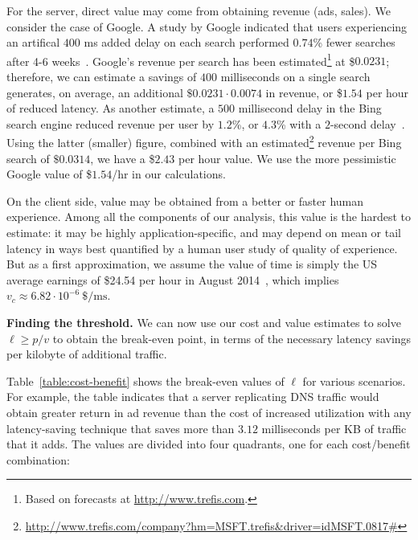 \documentclass{sigcomm-alternate}
\newcommand{\parheading}[1]{\medskip{} \noindent \textbf{#1}}
\begin{document}
For the server, direct value may come from obtaining revenue (ads, sales).  We consider the case of Google.  A study by Google indicated that users experiencing an artifical $400$ ms added delay on each search performed $0.74$\% fewer searches after 4-6 weeks~\cite{brutlag09}.  Google's revenue per search has been estimated\footnote{Based on forecasts at \url{http://www.trefis.com}.} at \$$0.0231$; therefore, we can estimate a savings of $400$ milliseconds on a single search generates, on average, an additional $\$0.0231\cdot0.0074$ in revenue, or \$$1.54$ per hour of reduced latency.  As another estimate, a $500$ millisecond delay in the Bing search engine reduced revenue per user by $1.2$\%, or $4.3$\% with a $2$-second delay~\cite{souders09velocity}. Using the latter (smaller) figure, combined with an estimated\footnote{\url{http://www.trefis.com/company?hm=MSFT.trefis&driver=idMSFT.0817#}} revenue per Bing search of $\$0.0314$, we have a \$$2.43$ per hour value. We use the more pessimistic Google value of \$$1.54$/hr in our calculations.

On the client side, value may be obtained from a better or faster human experience.  Among all the components of our analysis, this value is the hardest to estimate: it may be highly application-specific, and may depend on mean or tail latency in ways best quantified by a human user study of quality of experience.  But as a first approximation, we assume the value of time is simply the US average earnings of \$24.54 per hour in August 2014~\cite{avgHourlyWage}, which implies $v_c \approx 6.82 \cdot 10^{-6} ~\$/\textrm{ms}$.

\parheading{Finding the threshold.}  We can now use our cost and value estimates to solve $\ell \geq p / v$ to obtain the break-even point, in terms of the necessary latency savings per kilobyte of additional traffic.

Table~\ref{table:cost-benefit} shows the break-even values of $\ell$ for various scenarios.  For example, the table indicates that a server replicating DNS traffic would obtain greater return in ad revenue than the cost of increased utilization with any latency-saving technique that saves more than $3.12$ milliseconds per KB of traffic that it adds.  The values are divided into four quadrants, one for each cost/benefit combination:

\newcommand{\subfigures}[1]{
\centering
\subfigure[Chrome, Emulab]{
\texttt{[image: figures/emulab-\#1]}
}
\hspace{0.02\textwidth}
\subfigure[Firefox, residential DSL connection]{
\texttt{[image: figures/residential-\#1]}
}
}
\end{document}
